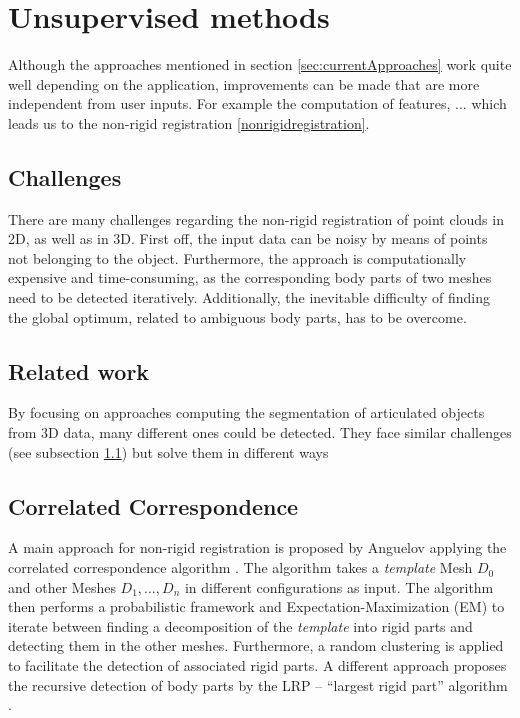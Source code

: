 \section{Unsupervised methods}
\label{unsupervised}

Although the approaches mentioned in section \ref{sec:currentApproaches} work quite well depending on the application, improvements can be made that are more independent from user inputs. For example the computation of features, ... which leads us to the non-rigid registration \ref{nonrigidregistration}.

\subsection{Challenges}
\label{Challenges}
There are many challenges regarding the non-rigid registration of point clouds in 2D, as well as in 3D. First off, the input data can be noisy by means of points not belonging to the object. Furthermore, the approach is computationally expensive and time-consuming, as the corresponding body parts of two meshes need to be detected iteratively. Additionally, the inevitable difficulty of finding the global optimum, related to ambiguous body parts, has to be overcome.

\subsection{Related work}
\label{sec:RelatedWork}

By focusing on approaches computing the segmentation of articulated objects from 3D data, many different ones could be detected. They face similar challenges (see subsection \ref{Challenges}) but solve them in different ways
\subsection{Correlated Correspondence}

A main approach for non-rigid registration is proposed by Anguelov \cite{Anguelov04} applying the correlated correspondence algorithm \cite{CorrelatedCorrespondance}. The algorithm takes a \textit{template} Mesh $D_0$ and other Meshes $D_1,\ldots,D_n$ in different configurations as input. The algorithm then performs a probabilistic framework and Expectation-Maximization (EM) to iterate between finding a decomposition of the \textit{template} into rigid parts and detecting them in the other meshes. Furthermore, a random clustering is applied to facilitate the detection of associated rigid parts.
A different approach proposes the recursive detection of body parts by the LRP -- ``largest rigid part'' algorithm \cite {guo2016correspondence}. 
